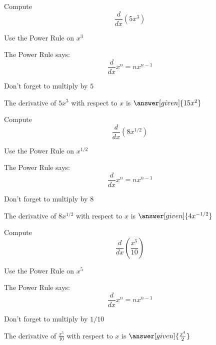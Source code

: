 \documentclass{ximera}
\begin{document}
\begin{problem} %
  Compute 
  \[
  \frac{d}{dx} \left(5x^3\right)
  \]
  
    \begin{hint}
      Use the Power Rule on $x^3$
    \end{hint}
    \begin{hint}
      The Power Rule says:
      \[
      \frac{d}{dx} x^n = nx^{n-1}
      \]
    \end{hint}
		\begin{hint}
		  Don't forget to multiply by $5$
		\end{hint}
		The derivative of $5x^3$ with respect to $x$ is
		 $\answer[given]{15x^2}$
	
\end{problem}

\begin{problem} %
  Compute 
  \[
  \frac{d}{dx} \left(8x^{1/2}\right)
  \]
  
    \begin{hint}
      Use the Power Rule on $x^{1/2}$
    \end{hint}
    \begin{hint}
      The Power Rule says:
      \[
      \frac{d}{dx} x^n = nx^{n-1}
      \]
    \end{hint}
		\begin{hint}
		  Don't forget to multiply by $8$
		\end{hint}
		The derivative of $8x^{1/2}$ with respect to $x$ is
		 $\answer[given]{4x^{-1/2}}$
	
\end{problem}

\begin{problem} %
  Compute 
  \[
  \frac{d}{dx} \left(\frac{x^5}{10}\right)
  \]
  
    \begin{hint}
      Use the Power Rule on $x^5$
    \end{hint}
    \begin{hint}
      The Power Rule says:
      \[
      \frac{d}{dx} x^n = nx^{n-1}
      \]
    \end{hint}
		\begin{hint}
		  Don't forget to multiply by $1/10$
		\end{hint}
		
		The derivative of $\frac{x^5}{10}$ with respect to $x$ is
		 $\answer[given]{\frac{x^4}{2}}$
	
\end{problem}
\end{document}
